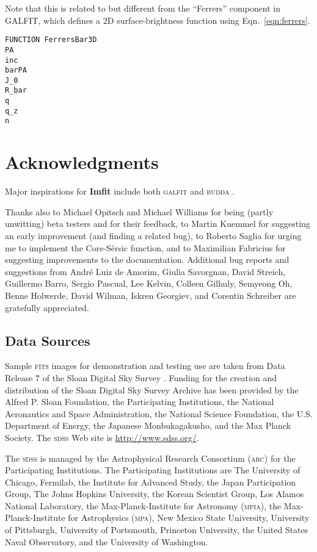 \documentclass[10pt,a4paper,article]{memoir}
\newcommand{\Imfit}{\textbf{Imfit}}
\begin{document}
Note that this is related to but different from the ``Ferrers'' component
in GALFIT, which defines a 2D surface-brightness function using Eqn.~\ref{eqn:ferrers}.

\begin{verbatim}
FUNCTION FerrersBar3D
PA
inc
barPA
J_0
R_bar
q
q_z
n
\end{verbatim}




\chapter{Acknowledgments}

Major inspirations for \Imfit{} include both \textsc{galfit} \citep{peng02,peng10} and 
\textsc{budda} \citep{desouza04,gadotti08}.

Thanks also to Michael Opitsch and Michael Williams for being (partly
unwitting) beta testers and for their feedback, to Martin Kuemmel for
suggesting an early improvement (and finding a related bug), to Roberto
Saglia for urging me to implement the Core-S{\'e}rsic function, and to
Maximilian Fabricius for suggesting improvements to the documentation.
Additional bug reports and suggestions from Andr{\'e} Luiz de Amorim,
Giulia Savorgnan, David Streich, Guillermo Barro, Sergio Pascual, Lee
Kelvin, Colleen Gilhuly, Semyeong Oh, Benne Holwerde, David Wilman, 
Iskren Georgiev, and Corentin Schreiber are gratefully appreciated.


\section{Data Sources}

Sample \textsc{fits} images for demonstration and testing use are taken
from Data Release 7 \citep{abazajian09} of the Sloan Digital Sky Survey
\citep{york00}. Funding for the creation and distribution of the Sloan
Digital Sky Survey Archive has been provided by the Alfred P. Sloan
Foundation, the Participating Institutions, the National Aeronautics and
Space Administration, the National Science Foundation, the U.S.
Department of Energy, the Japanese Monbukagakusho, and the Max Planck
Society. The \textsc{sdss} Web site is \url{http://www.sdss.org/}.

The \textsc{sdss} is managed by the Astrophysical Research Consortium
(\textsc{arc}) for the Participating Institutions.  The Participating
Institutions are The University of Chicago, Fermilab, the Institute for
Advanced Study, the Japan Participation Group, The Johns Hopkins
University, the Korean Scientist Group, Los Alamos National Laboratory,
the Max-Planck-Institute for Astronomy (\textsc{mpia}), the
Max-Planck-Institute for Astrophysics (\textsc{mpa}), New Mexico State
University, University of Pittsburgh, University of Portsmouth,
Princeton University, the United States Naval Observatory, and the
University of Washington.
\end{document}
